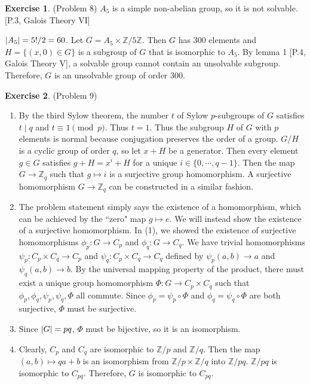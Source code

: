 \documentclass[12pt, psamsfonts]{amsart}
\theoremstyle{definition}
\newtheorem*{exer}{Exercise}
\theoremstyle{remark}
\numberwithin{equation}{section}
\begin{document}
\begin{exer}{(Problem 8)}
  $A_5$ is a simple non-abelian group, so it is not solvable.
  [P.3, Galois Theory VI]

  $\abs{A_5} = 5! / 2 = 60$.
  Let $G = A_5 \times \mathbb{Z}/5\mathbb{Z}$.
  Then $G$ has 300 elements and $H = \{ (x, 0) \in G \}$ is a subgroup of $G$ that is isomorphic to $A_5$.
  By lemma 1 [P.4, Galois Theory V], a solvable group cannot contain an unsolvable subgroup.
  Therefore, $G$ is an unsolvable group of order 300.
\end{exer}

\begin{exer}{(Problem 9)}
  \begin{enumerate}
    \item
      By the third Sylow theorem, the number $t$ of Sylow $p$-subgroups of $G$ satisfies $t \mid q$ and $t \equiv 1 \pmod p$.
      Thus $t = 1$.
      Thus the subgroup $H$ of $G$ with $p$ elements is normal because conjugation preserves the order of a group.
      $G / H$ is a cyclic group of order $q$, so let $x + H$ be a generator.
      Then every element $g \in G$ satisfies $g + H = x^i + H$ for a unique $i \in \{ 0, \cdots, q - 1 \}$.
      Then the map $G \rightarrow \mathbb{Z}_{q}$ such that $g \mapsto i$ is a surjective group homomorphism.
      A surjective homomorphism $G \rightarrow \mathbb{Z}_q$ can be constructed in a similar fashion.
    \item
      The problem statement simply says the existence of a homomorphism, which can be achieved by the ``zero" map $g \mapsto e$.
      We will instead show the existence of a surjective homomorphism.
      In (1), we showed the existence of surjective homomorphisms $\phi_p: G \rightarrow C_p$ and $\phi_q: G \rightarrow C_q$.
      We have trivial homomorphisms $\psi_p: C_p \times C_q \rightarrow C_p$ and $\psi_q: C_p \times C_q \rightarrow C_q$ defined by $\psi_p(a, b) \rightarrow a$ and $\psi_q(a, b) \rightarrow b$.
      By the universal mapping property of the product, there must exist a unique group homomorphism $\Phi: G \rightarrow C_p \times C_q$ such that $\phi_p, \phi_q, \psi_p, \psi_q, \Phi$ all commute.
      Since $\phi_p = \psi_p \circ \Phi$ and $\phi_q = \psi_q \circ \Phi$ are both surjective, $\Phi$ must be surjective.
    \item
      Since $\abs{G} = pq$, $\Phi$ must be bijective, so it is an isomorphism.
    \item
      Clearly, $C_p$ and $C_q$ are isomorphic to $\mathbb{Z}/p$ and $\mathbb{Z}/q$.
      Then the map $(a, b) \mapsto qa + b$ is an isomorphism from $\mathbb{Z}/p \times \mathbb{Z}/q$ into $\mathbb{Z}/pq$.
      $\mathbb{Z}/pq$ is isomorphic to $C_{pq}$.
      Therefore, $G$ is isomorphic to $C_{pq}$.
  \end{enumerate}
\end{exer}
\end{document}
